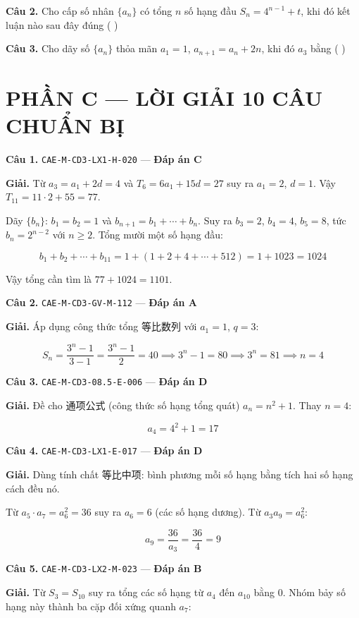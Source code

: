 \documentclass[11pt, a4paper]{article}
\begin{document}
\textbf{Câu 2.} Cho cấp số nhân $\{a_n\}$ có tổng $n$ số hạng đầu $S_n = 4^{n-1} + t$, khi đó kết luận nào sau đây đúng ( )

\textbf{Câu 3.} Cho dãy số $\{a_n\}$ thỏa mãn $a_1 = 1$, $a_{n+1} = a_n + 2n$, khi đó $a_3$ bằng ( )

\section{PHẦN C — LỜI GIẢI 10 CÂU CHUẨN BỊ}

\textbf{Câu 1.} \texttt{CAE-M-CD3-LX1-H-020} — \textbf{Đáp án C}

\textbf{Giải.} Từ $a_3 = a_1 + 2d = 4$ và $T_6 = 6a_1 + 15d = 27$ suy ra $a_1 = 2$, $d = 1$. Vậy $T_{11} = 11 \cdot 2 + 55 = 77$.

Dãy $\{b_n\}$: $b_1 = b_2 = 1$ và $b_{n+1} = b_1 + \cdots + b_n$. Suy ra $b_3 = 2$, $b_4 = 4$, $b_5 = 8$, tức $b_n = 2^{n-2}$ với $n \ge 2$. Tổng mười một số hạng đầu:

$$b_1 + b_2 + \cdots + b_{11} = 1 + (1 + 2 + 4 + \cdots + 512) = 1 + 1023 = 1024$$

Vậy tổng cần tìm là $77 + 1024 = 1101$.

\textbf{Câu 2.} \texttt{CAE-M-CD3-GV-M-112} — \textbf{Đáp án A}

\textbf{Giải.} Áp dụng công thức tổng 等比数列 với $a_1 = 1$, $q = 3$:

$$S_n = \frac{3^n - 1}{3 - 1} = \frac{3^n - 1}{2} = 40 \implies 3^n - 1 = 80 \implies 3^n = 81 \implies n = 4$$

\textbf{Câu 3.} \texttt{CAE-M-CD3-08.5-E-006} — \textbf{Đáp án D}

\textbf{Giải.} Đề cho 通项公式 (công thức số hạng tổng quát) $a_n = n^2 + 1$. Thay $n = 4$:

$$a_4 = 4^2 + 1 = 17$$

\textbf{Câu 4.} \texttt{CAE-M-CD3-LX1-E-017} — \textbf{Đáp án D}

\textbf{Giải.} Dùng tính chất 等比中项: bình phương mỗi số hạng bằng tích hai số hạng cách đều nó.

Từ $a_5 \cdot a_7 = a_6^2 = 36$ suy ra $a_6 = 6$ (các số hạng dương). Từ $a_3 a_9 = a_6^2$:

$$a_9 = \frac{36}{a_3} = \frac{36}{4} = 9$$

\textbf{Câu 5.} \texttt{CAE-M-CD3-LX2-M-023} — \textbf{Đáp án B}

\textbf{Giải.} Từ $S_3 = S_{10}$ suy ra tổng các số hạng từ $a_4$ đến $a_{10}$ bằng $0$. Nhóm bảy số hạng này thành ba cặp đối xứng quanh $a_7$:
\end{document}
